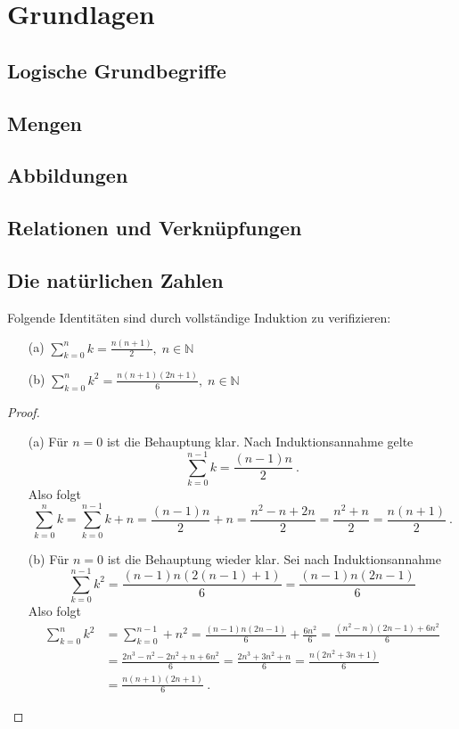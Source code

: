 \chapter{Grundlagen}
\section{Logische Grundbegriffe}
\section{Mengen}
\section{Abbildungen}
\section{Relationen und Verknüpfungen}
\section{Die natürlichen Zahlen}
\setcounter{aufgabe}{1}
\begin{aufgabe}
Folgende Identitäten sind durch vollständige Induktion zu verifizieren:
\begin{enumerate}
	\item[(a)] $\displaystyle \sum_{k=0}^n k = \frac{n (n+1)}{2}  , \; n \in \mathbb N $
	\item[(b)] $\displaystyle \sum_{k=0}^n k^2 = \frac{ n (n+1) (2n+1) }{6}, \; n \in \mathbb N$
\end{enumerate}
\end{aufgabe}
\begin{proof}
	\begin{enumerate}
		\item[(a)] Für $n = 0$ ist die Behauptung klar. Nach Induktionsannahme gelte
			\[
				\sum_{k=0}^{n-1} k = \frac{(n-1) n}{2} \ .
			\]
			Also folgt
			\[
				\sum_{k=0}^n k = \sum_{k=0}^{n-1} k + n = \frac{(n-1) n}{2} + n
					= \frac{n^2 - n + 2n}{2} = \frac{n^2 + n}{2} = \frac{n (n+1)}{2} \ .
			\]
		\item[(b)] Für $n = 0$ ist die Behauptung wieder klar.
			Sei nach Induktionsannahme
			\[
				\sum_{k=0}^{n-1} k^2 = \frac{(n-1) n (2(n-1) + 1)}{6} = \frac{(n-1) n (2n-1)}{6}
			\]
			Also folgt
			\begin{align*}
				\sum_{k=0}^n k^2 &= \sum_{k=0}^{n-1} + n^2
					= \frac{(n-1) n (2n-1)}{6} + \frac{6n^2}{6}
					= \frac{(n^2-n) (2n-1) + 6n^2}{6} \\
					&= \frac{2n^3 - n^2 - 2n^2 + n + 6n^2}{6}
					= \frac{2n^3 + 3n^2 + n}{6}
					= \frac{ n(2n^2 + 3n + 1)}{6} \\
					&= \frac{n (n+1) (2n+1)}{6} \ .
			\end{align*}
	\end{enumerate}
\end{proof}

